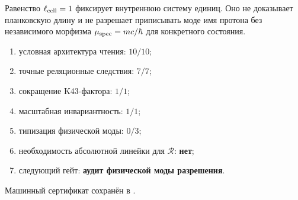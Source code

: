 \begin{nogocriterion}
Равенство $\ell_{\rm cell}=1$ фиксирует внутреннюю систему единиц. Оно не
доказывает планковскую длину и не разрешает приписывать моде имя протона без
независимого морфизма $\mu_{\rm spec}=mc/\hbar$ для конкретного состояния.
\end{nogocriterion}

\begin{protocol}\begin{enumerate}
\item условная архитектура чтения: \textbf{$10/10$};
\item точные реляционные следствия: \textbf{$7/7$};
\item сокращение K43-фактора: \textbf{$1/1$};
\item масштабная инвариантность: \textbf{$1/1$};
\item типизация физической моды: \textbf{$0/3$};
\item необходимость абсолютной линейки для $\mathcal R$: \textbf{нет};
\item следующий гейт: \textbf{аудит физической моды разрешения}.
\end{enumerate}\end{protocol}

Машинный сертификат сохранён в
.